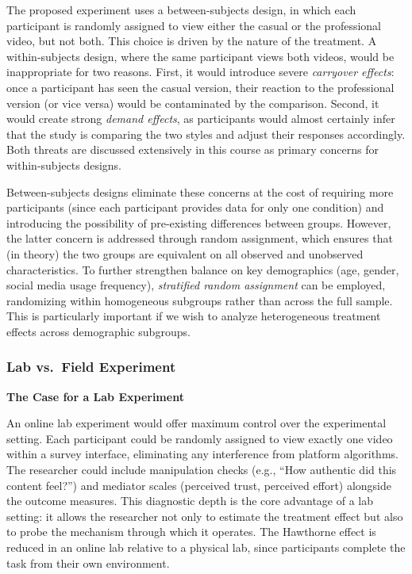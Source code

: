 \documentclass[10pt]{article}
\begin{document}
The proposed experiment uses a between-subjects design, in which each participant is randomly assigned to view either the casual or the professional video, but not both. This choice is driven by the nature of the treatment. A within-subjects design, where the same participant views both videos, would be inappropriate for two reasons. First, it would introduce severe \textit{carryover effects}: once a participant has seen the casual version, their reaction to the professional version (or vice versa) would be contaminated by the comparison. Second, it would create strong \textit{demand effects}, as participants would almost certainly infer that the study is comparing the two styles and adjust their responses accordingly. Both threats are discussed extensively in this course as primary concerns for within-subjects designs.

Between-subjects designs eliminate these concerns at the cost of requiring more participants (since each participant provides data for only one condition) and introducing the possibility of pre-existing differences between groups. However, the latter concern is addressed through random assignment, which ensures that (in theory) the two groups are equivalent on all observed and unobserved characteristics. To further strengthen balance on key demographics (age, gender, social media usage frequency), \textit{stratified random assignment} can be employed, randomizing within homogeneous subgroups rather than across the full sample. This is particularly important if we wish to analyze heterogeneous treatment effects across demographic subgroups.

\subsubsection{Lab vs.\ Field Experiment}

\textbf{The Case for a Lab Experiment}

An online lab experiment would offer maximum control over the experimental setting. Each participant could be randomly assigned to view exactly one video within a survey interface, eliminating any interference from platform algorithms. The researcher could include manipulation checks (e.g., ``How authentic did this content feel?'') and mediator scales (perceived trust, perceived effort) alongside the outcome measures. This diagnostic depth is the core advantage of a lab setting: it allows the researcher not only to estimate the treatment effect but also to probe the mechanism through which it operates. The Hawthorne effect is reduced in an online lab relative to a physical lab, since participants complete the task from their own environment.
\end{document}
